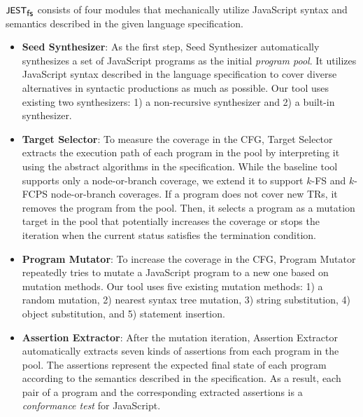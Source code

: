 $\textsf{\small JEST}_{\textsf{\small fs}}$ consists of four modules that mechanically utilize JavaScript syntax and
semantics described in the given language specification.
\begin{itemize}
  \item \textsf{\textbf{Seed Synthesizer}}:
    As the first step, \textsf{Seed Synthesizer} automatically synthesizes a set
    of JavaScript programs as the initial \textit{program pool}.
    It utilizes JavaScript syntax described in the language specification to
    cover diverse alternatives in syntactic productions as much as possible.
    Our tool uses existing two synthesizers: 1) a non-recursive synthesizer and
    2) a built-in synthesizer.
  \item \textsf{\textbf{Target Selector}}:
    To measure the coverage in the CFG, \textsf{Target Selector} extracts the
    execution path of each program in the pool by interpreting it using the
    abstract algorithms in the specification.
    While the baseline tool supports only a node-or-branch coverage, we extend
    it to support $k$-FS and $k$-FCPS node-or-branch coverages.
    If a program does not cover new TRs, it removes the program from the pool.
    Then, it selects a program as a mutation target in the pool that potentially
    increases the coverage or stops the iteration when the current status
    satisfies the termination condition.
  \item \textsf{\textbf{Program Mutator}}:
    To increase the coverage in the CFG, \textsf{Program Mutator} repeatedly
    tries to mutate a JavaScript program to a new one based on mutation methods.
    Our tool uses five existing mutation methods: 1) a random mutation, 2)
    nearest syntax tree mutation, 3) string substitution, 4) object
    substitution, and 5) statement insertion.
  \item \textsf{\textbf{Assertion Extractor}}:
    After the mutation iteration, \textsf{Assertion Extractor} automatically
    extracts seven kinds of assertions from each program in the pool.
    The assertions represent the expected final state of each program according
    to the semantics described in the specification.
    As a result, each pair of a program and the corresponding extracted
    assertions is a \textit{conformance test} for JavaScript.
\end{itemize}


